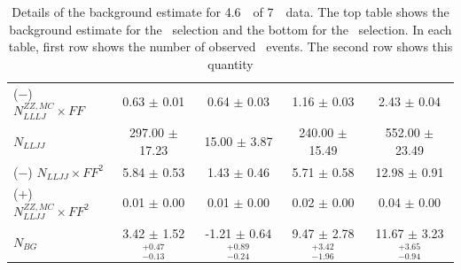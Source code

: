 \begin{table}[htbp]
\begin{tabular}{lcccc}
($-$) $N_{LLLJ}^{ZZ,MC}  \times FF$ &                      0.63 $\pm$ 0.01 &                      0.64 $\pm$ 0.03 &                     1.16 $\pm$ 0.03 &                      2.43 $\pm$ 0.04 \\
$N_{LLJJ}$                          &                   297.00 $\pm$ 17.23 &                     15.00 $\pm$ 3.87 &                  240.00 $\pm$ 15.49 &                   552.00 $\pm$ 23.49 \\
($-$) $N_{LLJJ} \times FF^{2}$      &                      5.84 $\pm$ 0.53 &                      1.43 $\pm$ 0.46 &                     5.71 $\pm$ 0.58 &                     12.98 $\pm$ 0.91 \\
($+$) $N_{LLJJ}^{ZZ,MC}\times FF^2$ &                      0.01 $\pm$ 0.00 &                      0.01 $\pm$ 0.00 &                     0.02 $\pm$ 0.00 &                      0.04 $\pm$ 0.00 \\
\hline                                  
$N_{BG}$                            &  3.42 $\pm$ 1.52 $^{+0.47}_{-0.13}$ &  -1.21 $\pm$ 0.64 $^{+0.89}_{-0.24}$ &  9.47 $\pm$ 2.78 $^{+3.42}_{-1.96}$ &  11.67 $\pm$ 3.23 $^{+3.65}_{-0.94}$ \\
\hline\hline
\end{tabular}
\renewcommand\arraystretch{1.}
\caption[Details of the background estimate for 4.6~\ifb\ of 7~\tev\
data.]{\small Details of the background estimate for 4.6~\ifb\ of 7~\tev\
data. The top table shows the background estimate for the \ZZ\ selection and the
bottom for the \ZZs\ selection. In each table, first row
shows the number of observed \LLLJ\ events. The second row shows this quantity
}
\end{table}

